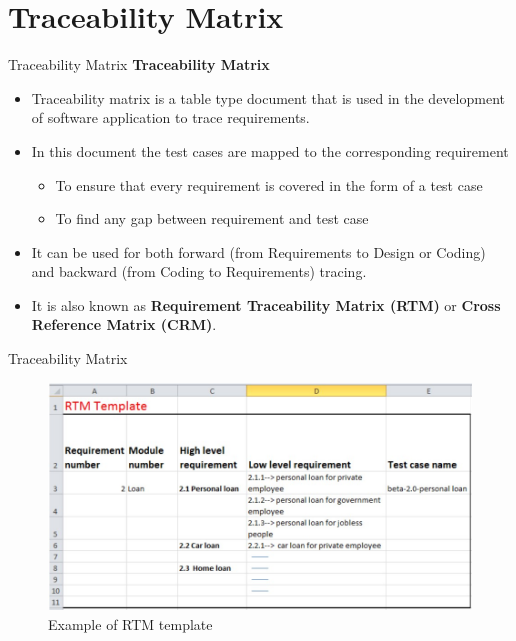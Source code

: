 \documentclass{beamer}
\begin{document}
\section{Traceability Matrix}
\begin{frame}{Traceability Matrix}
	\textbf{Traceability Matrix}
\begin{itemize}
	\item Traceability matrix is a table type document that is used in the development of software application to trace requirements.
	\item In this document the test cases are mapped to the corresponding requirement
	\begin{itemize}
		\item To ensure that every requirement is covered in the form of a test case
		\item To find any gap between requirement and test case
	\end{itemize} 
	\item It can be used for both forward (from Requirements to Design or Coding) and backward (from Coding to Requirements) tracing.
	\item It is also known as \textbf{Requirement Traceability Matrix (RTM)} or \textbf{Cross Reference Matrix (CRM)}. 

\end{itemize}
\end{frame}
\begin{frame}{Traceability Matrix}
\begin{figure}
	\includegraphics[scale=.55]{img/m2_12.jpg}
	\caption{Example of RTM template}
\end{figure}
\end{frame}
\end{document}
